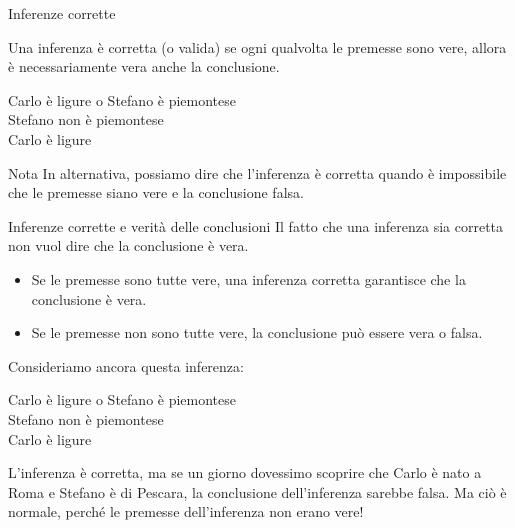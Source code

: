 \documentclass[aspectratio=169,10pt,dvipsnames,handout]{beamer}
\begin{document}
\begin{frame}{Inferenze corrette}
	\begin{definition}
		Una inferenza è \alert{corretta} (o \alert{valida}) se ogni qualvolta le premesse sono vere, allora è necessariamente
		vera anche la conclusione.
	\end{definition}
	\begin{example}[Inferenza corretta]


		\begin{center}
			\begin{inference}
				Carlo è ligure o Stefano è piemontese\\
				Stefano non è piemontese\\
				\hline
				Carlo è ligure
			\end{inference}
		\end{center}
	\end{example}
	\begin{block}{Nota}
		In alternativa, possiamo dire che l'inferenza è corretta quando è impossibile che le premesse siano vere e la conclusione falsa.
	\end{block}
\end{frame}


\begin{frame}{Inferenze corrette e verità delle conclusioni}
	Il fatto che una inferenza sia corretta non vuol dire che la conclusione è vera.
	\begin{itemize}
		\item  \alert{Se le premesse sono tutte vere}, una inferenza corretta garantisce che la conclusione è vera.
		\item \alert{Se le premesse non sono tutte vere}, la conclusione può essere vera o falsa.
	\end{itemize}

	\medskip
	Consideriamo ancora questa inferenza:

	\begin{center}
		\begin{inference}
			Carlo è ligure o Stefano è piemontese\\
			Stefano non è piemontese\\
			\hline
			Carlo è ligure
		\end{inference}
	\end{center}

	\medskip
	L'inferenza è corretta, ma se un giorno dovessimo scoprire che Carlo è nato a Roma e Stefano è di Pescara, la conclusione dell'inferenza sarebbe falsa. Ma ciò è normale, perché le premesse dell'inferenza non erano vere!
\end{frame}
\end{document}
